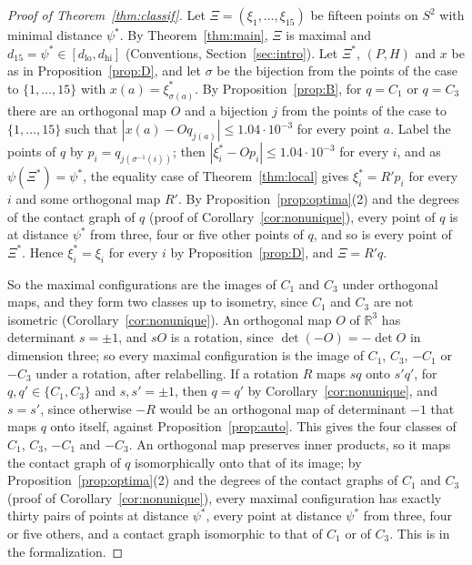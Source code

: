\documentclass[12pt]{amsart}
\theoremstyle{definition}
\theoremstyle{plain}
\theoremstyle{definition}
\newcommand{\R}{\mathbb{R}}
\newcommand{\Sph}{S^2}
\newcommand{\psis}{\psi^{*}}
\newcommand{\dlo}{d_{\mathrm{lo}}}
\newcommand{\dhi}{d_{\mathrm{hi}}}
\newcommand{\CI}{C_1}
\newcommand{\CIII}{C_3}
\begin{document}
\begin{proof}[Proof of Theorem~\ref{thm:classif}]
Let $\Xi=(\xi_1,\dots,\xi_{15})$ be fifteen points on $\Sph$ with minimal distance $\psis$. By Theorem~\ref{thm:main}, $\Xi$ is maximal and $d_{15}=\psis\in[\dlo,\dhi]$ (Conventions, Section~\ref{sec:intro}). Let $\Xi^*$, $(P,H)$ and $x$ be as in Proposition~\ref{prop:D}, and let $\sigma$ be the bijection from the points of the case to $\{1,\dots,15\}$ with $x(a)=\xi^*_{\sigma(a)}$. By Proposition~\ref{prop:B}, for $q=\CI$ or $q=\CIII$ there are an orthogonal map $O$ and a bijection $j$ from the points of the case to $\{1,\dots,15\}$ such that $|x(a)-Oq_{j(a)}|\le1.04\cdot10^{-3}$ for every point $a$. Label the points of $q$ by $p_i=q_{j(\sigma^{-1}(i))}$; then $|\xi^*_i-Op_i|\le1.04\cdot10^{-3}$ for every $i$, and as $\psi(\Xi^*)=\psis$, the equality case of Theorem~\ref{thm:local} gives $\xi^*_i=R'p_i$ for every $i$ and some orthogonal map $R'$. By Proposition~\ref{prop:optima}(2) and the degrees of the contact graph of $q$ (proof of Corollary~\ref{cor:nonunique}), every point of $q$ is at distance $\psis$ from three, four or five other points of $q$, and so is every point of $\Xi^*$. Hence $\xi^*_i=\xi_i$ for every $i$ by Proposition~\ref{prop:D}, and $\Xi=R'q$.

So the maximal configurations are the images of $\CI$ and $\CIII$ under orthogonal maps, and they form two classes up to isometry, since $\CI$ and $\CIII$ are not isometric (Corollary~\ref{cor:nonunique}). An orthogonal map $O$ of $\R^3$ has determinant $s=\pm1$, and $sO$ is a rotation, since $\det(-O)=-\det O$ in dimension three; so every maximal configuration is the image of $\CI$, $\CIII$, $-\CI$ or $-\CIII$ under a rotation, after relabelling. If a rotation $R$ maps $sq$ onto $s'q'$, for $q,q'\in\{\CI,\CIII\}$ and $s,s'=\pm1$, then $q=q'$ by Corollary~\ref{cor:nonunique}, and $s=s'$, since otherwise $-R$ would be an orthogonal map of determinant $-1$ that maps $q$ onto itself, against Proposition~\ref{prop:auto}. This gives the four classes of $\CI$, $\CIII$, $-\CI$ and $-\CIII$. An orthogonal map preserves inner products, so it maps the contact graph of $q$ isomorphically onto that of its image; by Proposition~\ref{prop:optima}(2) and the degrees of the contact graphs of $\CI$ and $\CIII$ (proof of Corollary~\ref{cor:nonunique}), every maximal configuration has exactly thirty pairs of points at distance $\psis$, every point at distance $\psis$ from three, four or five others, and a contact graph isomorphic to that of $\CI$ or of $\CIII$. This is  in the formalization.
\end{proof}
\end{document}
